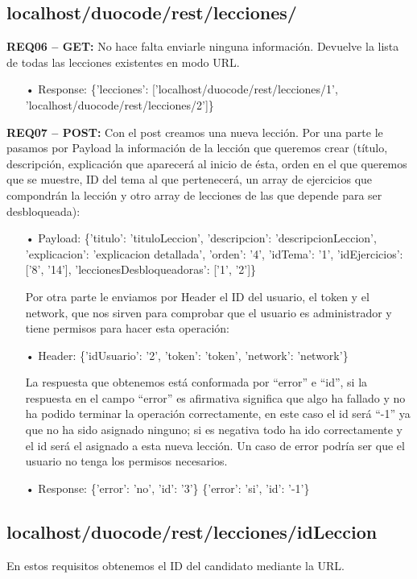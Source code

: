 \subsection{localhost/duocode/rest/lecciones/}
\textbf{REQ06 – GET:} No hace falta enviarle ninguna información. Devuelve la lista de todas las lecciones existentes en modo URL. 
\begin{itemize}
\item[•]Response:
\{'lecciones': ['localhost/duocode/rest/lecciones/1', 'localhost/duocode/rest/lecciones/2']\}
\end{itemize}

\textbf{REQ07 – POST:} Con el post creamos una nueva lección. Por una parte le pasamos por Payload la información de la lección que queremos crear (título, descripción, explicación que aparecerá al inicio de ésta, orden en el que queremos que se muestre, ID del tema al que pertenecerá, un array de ejercicios que compondrán la lección y otro array de lecciones de las que depende para ser desbloqueada):

\begin{itemize}
\item[•]Payload: 
\{'titulo': 'tituloLeccion', 'descripcion': 'descripcionLeccion', 'explicacion': 'explicacion detallada', 'orden': '4', 'idTema': '1', 'idEjercicios': ['8', '14'], 'leccionesDesbloqueadoras': ['1', '2']\}
\vspace{1em}

Por otra parte le enviamos por Header el ID del usuario, el token y el network, que nos sirven para comprobar que el usuario es administrador y tiene permisos para hacer esta operación:
\item[•]Header: 
\{'idUsuario': '2', 'token': 'token', 'network': 'network'\}
\vspace{1em}

La respuesta que obtenemos está conformada por “error” e “id”, si la respuesta en el campo “error” es afirmativa significa que algo ha fallado y no ha podido terminar la operación correctamente, en este caso el id será “-1” ya que no ha sido asignado ninguno; si es negativa todo ha ido correctamente y el id será el asignado a esta nueva lección. Un caso de error podría ser que el usuario no tenga los permisos necesarios.
\item[•]Response: 
\{'error': 'no', 'id': '3'\}
\{'error': 'si', 'id': '-1'\}
\end{itemize}

\subsection{localhost/duocode/rest/lecciones/idLeccion}
En estos requisitos obtenemos el ID del candidato mediante la URL.
\vspace{1em}


